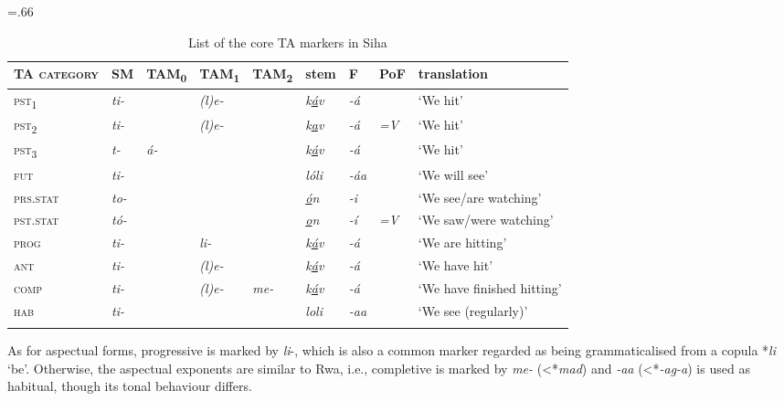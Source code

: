 \documentclass[output=paper]{langscibook}
\begin{document}
\begin{table}
\small\tabcolsep=.66\tabcolsep
\begin{tabularx}{\textwidth}{>{\scshape}llllllllQ}
\lsptoprule
{\normalfont TA category} & SM & {TAM\textsubscript{0}} & {TAM\textsubscript{1}} & {TAM\textsubscript{2}} & stem & F & PoF & translation\\\midrule
pst\textsubscript{1} & {\itshape ti-} &  & {\itshape (l)e-} &  & {\textit{k\ul{á}v}} & {\itshape {}-á} &  & `We hit'\\
pst\textsubscript{2} & {\itshape ti-} &  & {\textit{(l)e-}} &  & {\textit{k\ul{a}v}} & {\itshape {}-á} & {\itshape =V} & `We hit'\\
pst\textsubscript{3} & {\itshape t-} & {\itshape á-} &  &  & {\textit{k\ul{á}v}} & {\itshape {}-á} &  & `We hit'\\
fut                  & {\itshape ti-} &  &  &  & {\itshape lóli} & {\itshape {}-áa} &  & `We will see'\\
prs.stat             & {\itshape to-} &  &  &  & {\textit{\ul{ó}n}} & {\itshape {}-i} &  & `We see/are watching'\\
pst.stat             & {\itshape tó-} &  &  &  & {\textit{\ul{o}n}} & {\itshape {}-í} & {\itshape =V} & `We saw/were watching'\\
prog                 & {\itshape ti-} &  & {\itshape li-} &  & {\textit{k\ul{á}v}} & {\itshape {}-á} &  & {`We are hitting'}\\
ant                  & {\itshape ti-} &  & {\itshape (l)e-} &  & {\textit{k\ul{á}v}} & {\itshape {}-á} &  & `We have hit'\\
comp                 & {\itshape ti-} &  & {\itshape (l)e-} & {\itshape me-} & {\textit{k\ul{á}v}} & {\itshape {}-á} &  & `We have finished hitting'\\
hab                  & {\itshape ti-} &  &  &  & {\itshape loli} & {\itshape {}-aa} &  & `We see (regularly)'\\
\lspbottomrule
\end{tabularx}
\caption{List of the core TA markers in Siha}
\label{tab:shinagawa:2}
\end{table}

As for aspectual forms, progressive is marked by \textit{li}{}-, which is also a common marker regarded as being grammaticalised from a copula *\textit{li} ‘be’. Otherwise, the aspectual exponents are similar to Rwa, i.e., completive is marked by \textit{me-} (<*\textit{mad}) and \textit{{}-aa} (<*\textit{{}-ag-a}) is used as habitual, though its tonal behaviour differs.
\end{document}
